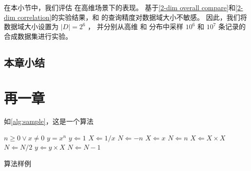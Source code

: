 在本小节中，我们评估 \myahead 在高维场景下的表现。
基于\autoref{2-dim overall compare}和\autoref{2-dim correlation}的实验结果，\myHDG 和 \myahead 的查询精度对数据域大小不敏感。
因此，我们将数据域大小设置为 $|D|=2^6$ ，
并分别从高维 \Laplacian 和 \Gaussian 分布中采样 $10^6$ 和 $10^7$ 条记录的合成数据集进行实验。










\section{本章小结}






















\chapter{再一章}

\par 如\autoref{alg:sample}，这是一个算法

\begin{algorithm}[H]
    \begin{algorithmic} %
        \REQUIRE $n \geq 0 \vee x \neq 0$
        \ENSURE $y = x^n$
        \STATE $y \Leftarrow 1$
            \STATE $X \Leftarrow 1 / x$
            \STATE $N \Leftarrow -n$
        \ELSE
            \STATE $X \Leftarrow x$
            \STATE $N \Leftarrow n$
        \ENDIF
                \STATE $X \Leftarrow X \times X$
                \STATE $N \Leftarrow N / 2$
            \ELSE[$N$ is odd]
                \STATE $y \Leftarrow y \times X$
                \STATE $N \Leftarrow N - 1$
            \ENDIF
        \ENDWHILE
    \end{algorithmic}
    \caption{\label{alg:sample}算法样例}
\end{algorithm}


